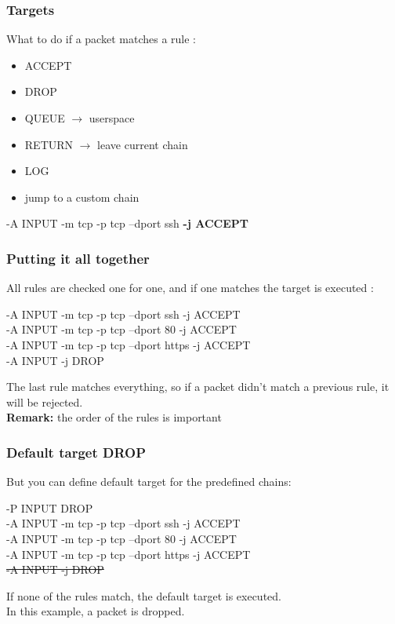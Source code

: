 \documentclass[14pt]{beamer}
\begin{document}
  \begin{frame}
    \frametitle{Targets}
    What to do if a packet matches a rule :
    \begin{itemize}
      \item ACCEPT
      \item DROP
      \item QUEUE $\rightarrow$ userspace
      \item RETURN $\rightarrow$ leave current chain
      \item LOG
      \item jump to a custom chain
    \end{itemize}
    \begin{example}
      \small{-A INPUT -m tcp -p tcp --dport ssh \textbf{-j ACCEPT}}
    \end{example}
  \end{frame}
  \begin{frame}
    \frametitle{Putting it all together}
    All rules are checked one for one, and if one matches the target is executed :
    \begin{example}
      \small{-A INPUT -m tcp -p tcp --dport ssh -j ACCEPT\\
      -A INPUT -m tcp -p tcp --dport 80 -j ACCEPT\\
      -A INPUT -m tcp -p tcp --dport https -j ACCEPT\\
      -A INPUT -j DROP}
    \end{example}
    The last rule matches everything, so if a packet didn't match a previous rule, it will be rejected.\\
    \pause
    \textbf{Remark:} the order of the rules is important
 \end{frame}
  \begin{frame}
    \frametitle{Default target DROP}
    But you can define default target for the predefined chains:
    \begin{example}
      \small{{\color{blue}-P INPUT DROP}\\
      -A INPUT -m tcp -p tcp --dport ssh -j ACCEPT\\
      -A INPUT -m tcp -p tcp --dport 80 -j ACCEPT\\
      -A INPUT -m tcp -p tcp --dport https -j ACCEPT\\
      \sout{{\color{red}-A INPUT -j DROP}}}
    \end{example}
    If none of the rules match, the default target is executed.\\
    In this example, a packet is dropped.
  \end{frame}
\end{document}
